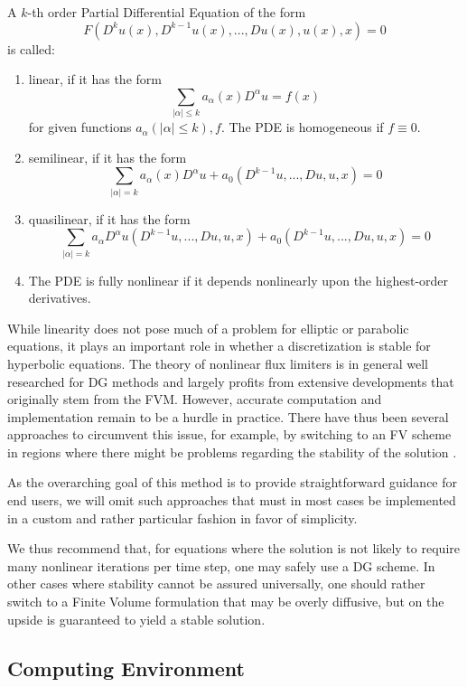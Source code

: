 \documentclass[asi,article,submit,moreauthors]{Definitions/mdpi}
\begin{document}
A $k$-th order Partial Differential Equation of the form $$F(D^k u(x), D^{k-1} u(x),...,Du(x), u(x), x) = 0$$ is called:
\begin{enumerate}
    \item linear, if it has the form
    $$ \sum\limits_{\lvert \alpha \rvert \leq k} a_\alpha (x) D^\alpha u = f(x) $$
    for given functions $a_\alpha (\lvert \alpha \rvert \leq k), f$. The PDE is homogeneous if $f \equiv 0$. 
    \item semilinear, if it has the form
    $$ \sum\limits_{\lvert \alpha \rvert = k} a_\alpha (x) D^\alpha u + a_0 (D^{k-1}u,...,Du,u,x) = 0 $$
    \item quasilinear, if it has the form
    $$ \sum\limits_{\lvert \alpha \rvert = k} a_\alpha D^\alpha u (D^{k-1}u,...,Du,u,x) + a_0 (D^{k-1}u,...,Du,u,x) = 0 $$
    \item The PDE is fully nonlinear if it depends nonlinearly upon the highest-order derivatives.
\end{enumerate}
While linearity does not pose much of a problem for elliptic or parabolic equations, it plays an important role in whether a discretization is stable for hyperbolic equations.
The theory of nonlinear flux limiters is in general well researched for DG methods and largely profits from extensive developments that originally stem from the FVM.
However, accurate computation and implementation remain to be a hurdle in practice.
There have thus been several approaches to circumvent this issue, for example, by switching to an FV scheme in regions where there might be problems regarding the stability of the solution \cite{maltsevHybridDiscontinuousGalerkinfinite2023,sonntagShockCapturingDiscontinuous2014}.

As the overarching goal of this method is to provide straightforward guidance for end users, we will omit such approaches that must in most cases be implemented in a custom and rather particular fashion in favor of simplicity.

We thus recommend that, for equations where the solution is not likely to require many nonlinear iterations per time step, one may safely use a DG scheme.
In other cases where stability cannot be assured universally, one should rather switch to a Finite Volume formulation that may be overly diffusive, but on the upside is guaranteed to yield a stable solution.

\subsection{Computing Environment}\label{sec:hardware}
\end{document}
